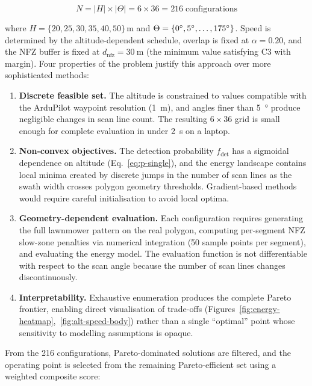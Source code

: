 \begin{equation}\label{eq:enum-size}
  N = |H| \times |\Theta| = 6 \times 36 = 216 \;\text{configurations}
\end{equation}

\noindent where $H = \{20, 25, 30, 35, 40, 50\}$\,m and $\Theta = \{0\degree, 5\degree, \ldots, 175\degree\}$. Speed is determined by the altitude-dependent schedule, overlap is fixed at $\alpha = 0.20$, and the NFZ buffer is fixed at $d_{\mathrm{nfz}} = \SI{30}{\metre}$ (the minimum value satisfying C3 with margin). Four properties of the problem justify this approach over more sophisticated methods:

\begin{enumerate}
  \item \textbf{Discrete feasible set.} The altitude is constrained to values compatible with the ArduPilot waypoint resolution (\SI{1}{\metre}), and angles finer than \SI{5}{\degree} produce negligible changes in scan line count. The resulting $6 \times 36$ grid is small enough for complete evaluation in under \SI{2}{\second} on a laptop.

  \item \textbf{Non-convex objectives.} The detection probability $f_{\mathrm{det}}$ has a sigmoidal dependence on altitude (Eq.~\eqref{eq:p-single}), and the energy landscape contains local minima created by discrete jumps in the number of scan lines as the swath width crosses polygon geometry thresholds. Gradient-based methods would require careful initialisation to avoid local optima.

  \item \textbf{Geometry-dependent evaluation.} Each configuration requires generating the full lawnmower pattern on the real polygon, computing per-segment NFZ slow-zone penalties via numerical integration (50 sample points per segment), and evaluating the energy model. The evaluation function is not differentiable with respect to the scan angle because the number of scan lines changes discontinuously.

  \item \textbf{Interpretability.} Exhaustive enumeration produces the complete Pareto frontier, enabling direct visualisation of trade-offs (Figures~\ref{fig:energy-heatmap},~\ref{fig:alt-speed-body}) rather than a single ``optimal'' point whose sensitivity to modelling assumptions is opaque.
\end{enumerate}

\noindent From the 216 configurations, Pareto-dominated solutions are filtered, and the operating point is selected from the remaining Pareto-efficient set using a weighted composite score:

